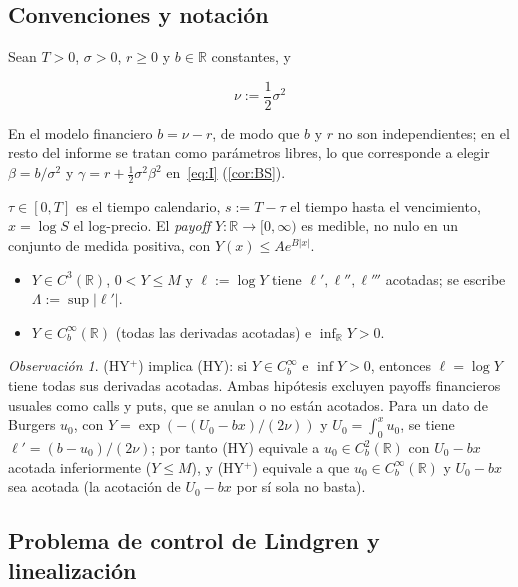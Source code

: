 \documentclass[11pt,letterpaper]{article}
\theoremstyle{plain}
\theoremstyle{definition}
\theoremstyle{remark}
\newtheorem{observacion}[theorem]{Observación}
\numberwithin{equation}{section}
\newcommand{\R}{\mathbb{R}}
\begin{document}
	\subsection{Convenciones y notación}
	
	Sean \(T>0\), \(\sigma>0\), \(r\ge0\) y \(b\in\R\) constantes, y
	
	\begin{equation}\label{eq:consts}
		\nu:=\frac12\sigma^2
	\end{equation}
	
	En el modelo financiero \(b=\nu-r\), de modo que \(b\) y \(r\) no son independientes; en el resto del informe se tratan como parámetros libres, lo que corresponde a elegir \(\beta=b/\sigma^2\) y \(\gamma=r+\frac12\sigma^2\beta^2\) en~\eqref{eq:I} (\cref{cor:BS}).
	
	\(\tau\in[0,T]\) es el tiempo calendario, \(s:=T-\tau\) el tiempo hasta el vencimiento, \(x=\log S\) el log-precio. El \emph{payoff} \(Y:\R\to[0,\infty)\) es medible, no nulo en un conjunto de medida positiva, con \(Y(x)\le Ae^{B|x|}\).
	
	\begin{itemize}[leftmargin=2em]
		\item[\textnormal{(HY)}] \(Y\in C^3(\R)\), \(0<Y\le M\) y \(\ell:=\log Y\) tiene \(\ell',\ell'',\ell'''\) acotadas; se escribe \(\Lambda:=\sup|\ell'|\).
	\end{itemize}
	
	\begin{itemize}[leftmargin=2em]
		\item[\textnormal{(HY\(^+\))}] \(Y\in C_b^\infty(\R)\) (todas las derivadas acotadas) e \(\inf_{\R}Y>0\).
	\end{itemize}
	
	\begin{observacion}\label{obs:hy}
		(HY\(^{+}\)) implica (HY): si \(Y\in C_b^\infty\) e \(\inf Y>0\), entonces \(\ell=\log Y\) tiene todas sus derivadas acotadas. Ambas hipótesis excluyen payoffs financieros usuales como calls y puts, que se anulan o no están acotados. Para un dato de Burgers \(u_0\), con \(Y=\exp(-(U_0-bx)/(2\nu))\) y \(U_0=\int_0^xu_0\), se tiene \(\ell'=(b-u_0)/(2\nu)\); por tanto (HY) equivale a \(u_0\in C_b^2(\R)\) con \(U_0-bx\) acotada inferiormente (\(Y\le M\)), y (HY\(^{+}\)) equivale a que \(u_0\in C_b^\infty(\R)\) y \(U_0-bx\) sea acotada (la acotación de \(U_0-bx\) por sí sola no basta).
	\end{observacion}
	
	\subsection{Problema de control de Lindgren y linealización}
	
\end{document}
